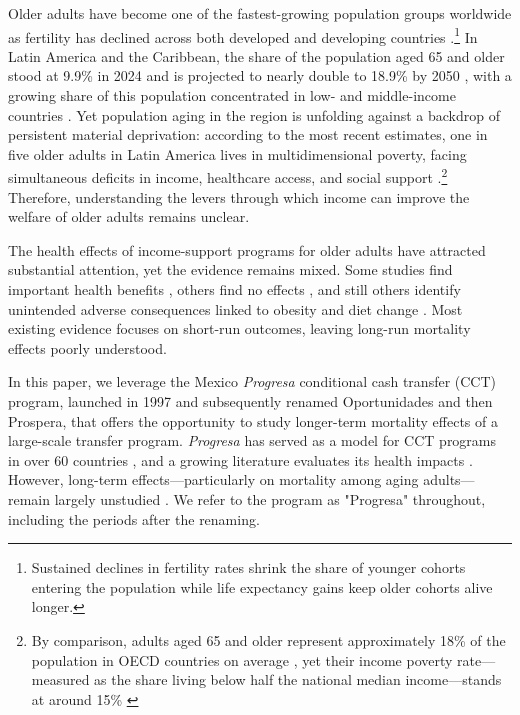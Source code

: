 \documentclass[12pt]{article}
\begin{document}
\p Older adults have become one of the fastest-growing population groups worldwide as fertility has declined across both developed and developing countries \citep{UN2024WPP}.\footnote{Sustained declines in fertility rates shrink the share of younger cohorts entering the population while life expectancy gains keep older cohorts alive longer.} In Latin America and the Caribbean, the share of the population aged 65 and older stood at 9.9\% in 2024 and is projected to nearly double to 18.9\% by 2050 \citep{UN2024WPP}, with a growing share of this population concentrated in low- and middle-income countries \citep{WHO2024Ageing}. Yet population aging in the region is unfolding against a backdrop of persistent material deprivation: according to the most recent estimates, one in five older adults in Latin America lives in multidimensional poverty, facing simultaneous deficits in income, healthcare access, and social support \citep{CEPAL2024SocialPanorama}.\footnote{By comparison, adults aged 65 and older represent approximately 18\% of the population in OECD countries on average \citep{OECD2024Society}, yet their income poverty rate—measured as the share living below half the national median income—stands at around 15\% \citep{OECD2024Society}} Therefore, understanding the levers through which income can improve the welfare of older adults remains unclear.


\p The health effects of income-support programs for older adults have attracted substantial attention, yet the evidence remains mixed. Some studies find important health benefits \citep{ Case2004PerspectivesAging, BarhamRowberry2013JDE, Aguila2015PNAS, MiglinoNavarrete2023AEJP, Menares2026JHR}, others find no effects \citep{LloydSherlockAgrawal2014JDS}, and still others identify unintended adverse consequences linked to obesity and diet change \citep{FernaldGertlerHou2008JN, KronebuschDamon2019EHB}. Most existing evidence focuses on short-run outcomes, leaving long-run mortality effects poorly understood.

\p In this paper, we leverage the Mexico \textit{Progresa} conditional cash transfer (CCT) program, launched in 1997 and subsequently renamed Oportunidades and then Prospera, that offers the opportunity to study longer-term mortality effects of a large-scale transfer program. \textit{Progresa} has served as a model for CCT programs in over 60 countries \citep{Fiszbein2009CCTBook, Baird2014JDEffectiveness, ParkerTodd2017JEL}, and a growing literature evaluates its health impacts \citep{Gertler2004AER, LagardeHainesPalmer2009Cochrane, RiveraHernandez2016HSR, ParkerTodd2017JEL}. However, long-term effects—particularly on mortality among aging adults—remain largely unstudied \citep{ParkerTodd2017JEL}. We refer to the program as "Progresa" throughout, including the periods after the renaming. 
\end{document}
